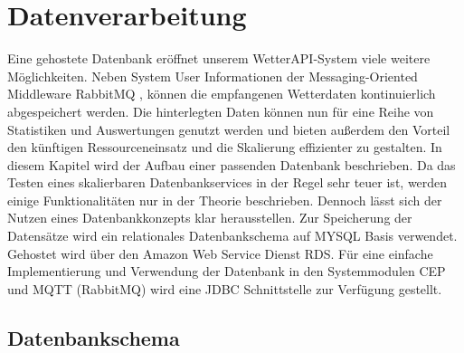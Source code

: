 \section{Datenverarbeitung}\label{db}

Eine gehostete Datenbank eröffnet unserem WetterAPI-System viele weitere Möglichkeiten. Neben System User Informationen der Messaging-Oriented Middleware RabbitMQ ,  können die empfangenen Wetterdaten kontinuierlich abgespeichert werden. Die hinterlegten Daten können nun für eine Reihe von Statistiken und Auswertungen genutzt werden und bieten außerdem den Vorteil  den künftigen Ressourceneinsatz und die Skalierung effizienter zu gestalten. 
In diesem Kapitel wird der Aufbau einer passenden Datenbank  beschrieben. Da das Testen eines skalierbaren Datenbankservices in der Regel sehr teuer ist, werden einige Funktionalitäten nur in der Theorie beschrieben. Dennoch lässt sich der Nutzen eines Datenbankkonzepts klar herausstellen.
Zur Speicherung der Datensätze wird ein relationales Datenbankschema auf MYSQL Basis verwendet. Gehostet wird über den Amazon Web Service Dienst RDS. Für eine einfache Implementierung und Verwendung der Datenbank in den Systemmodulen CEP und MQTT (RabbitMQ) wird eine JDBC Schnittstelle zur Verfügung gestellt.

\subsection{Datenbankschema}

